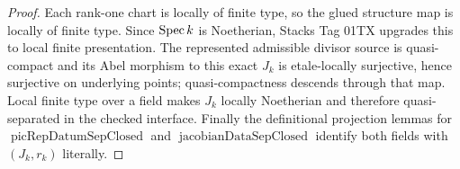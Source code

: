 \begin{proof}
  Each rank-one chart is locally of finite type, so the glued structure map
  is locally of finite type.  Since \(\operatorname{Spec} k\) is Noetherian, Stacks
  Tag 01TX upgrades this to local finite presentation.  The represented
  admissible divisor source is quasi-compact and its
  Abel morphism to this exact \(J_k\) is etale-locally surjective, hence
  surjective on underlying points; quasi-compactness descends through that
  map.  Local finite type over a field makes \(J_k\) locally Noetherian and
  therefore quasi-separated in the checked interface.  Finally the
  definitional projection lemmas for
  \(\operatorname{picRepDatumSepClosed}\) and
  \(\operatorname{jacobianDataSepClosed}\) identify both fields with
  \((J_k,r_k)\) literally.
\end{proof}
